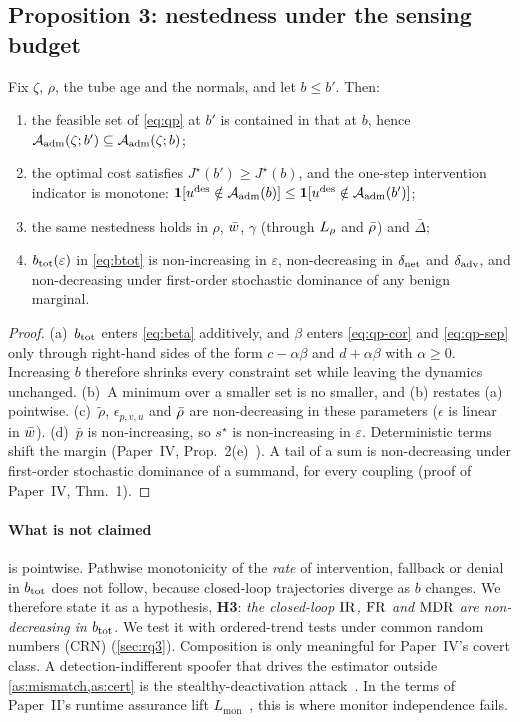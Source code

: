 \subsection{Proposition 3: nestedness under the sensing budget}
\begin{proposition}\label{prop:nested}
Fix $\zeta$, $\rho$, the tube age and the normals, and let $b\le b'$. Then:
\begin{enumerate}[label=(\alph*)]
\item the feasible set of \eqref{eq:qp} at $b'$ is contained in that at $b$,
  hence $\mathcal{A}_{\mathrm{adm}}(\zeta;b')\subseteq\mathcal{A}_{\mathrm{adm}}(\zeta;b)$;
\item the optimal cost satisfies $J^\star(b')\ge J^\star(b)$, and the
  one-step intervention indicator is monotone:
  $\mathbf 1[u^{\mathrm{des}}\notin\mathcal{A}_{\mathrm{adm}}(b)]\le\mathbf 1[u^{\mathrm{des}}\notin\mathcal{A}_{\mathrm{adm}}(b')]$;
\item the same nestedness holds in $\rho$, $\bar w$, $\gamma$ (through $L_{\rho}$
  and $\bar\rho$) and $\bar\Delta$;
\item $b_{\mathrm{tot}}(\varepsilon)$ in \eqref{eq:btot} is non-increasing in $\varepsilon$,
  non-decreasing in $\delta_{\mathrm{net}}$ and $\delta_{\mathrm{adv}}$, and non-decreasing under first-order
  stochastic dominance of any benign marginal.
\end{enumerate}
\end{proposition}
\begin{proof}
(a)~$b_{\mathrm{tot}}$ enters \eqref{eq:beta} additively, and $\beta$ enters
\eqref{eq:qp-cor} and \eqref{eq:qp-sep} only through right-hand sides of the
form $c-\alpha\beta$ and $d+\alpha\beta$ with $\alpha\ge0$. Increasing $b$
therefore shrinks every constraint set while leaving the dynamics unchanged.
(b)~A minimum over a smaller set is no smaller, and (b) restates (a)
pointwise. (c)~$\tilde\rho$, $\epsilon_{p,v,u}$ and $\bar\rho$ are
non-decreasing in these parameters ($\epsilon$ is linear in $\bar w$).
(d)~$\bar p$ is non-increasing, so $s^\star$ is non-increasing in
$\varepsilon$. Deterministic terms shift the margin (Paper~IV,
Prop.~2(e)~\cite{paperIV}). A tail of a sum is non-decreasing under
first-order stochastic dominance of a summand, for every coupling (proof of
Paper~IV, Thm.~1).
\end{proof}

\paragraph{What is not claimed}  is pointwise. Pathwise
monotonicity of the \emph{rate} of intervention, fallback or denial in
$b_{\mathrm{tot}}$ does not follow, because closed-loop trajectories diverge as $b$
changes. We therefore state it as a hypothesis,
\textbf{H3}: \emph{the closed-loop $\mathrm{IR}$, $\mathrm{FR}$ and $\mathrm{MDR}$ are non-decreasing
in $b_{\mathrm{tot}}$}. We test it with ordered-trend tests under common random numbers
(CRN) (\cref{sec:rq3}). Composition is only meaningful for Paper~IV's covert
class. A detection-indifferent spoofer that drives the estimator outside
\cref{as:mismatch,as:cert} is the stealthy-deactivation
attack~\cite{arnstrom2024stealthy}. In the terms of Paper~II's runtime
assurance lift $L_{\mathrm{mon}}$~\cite{paperII}, this is where monitor
independence fails.

